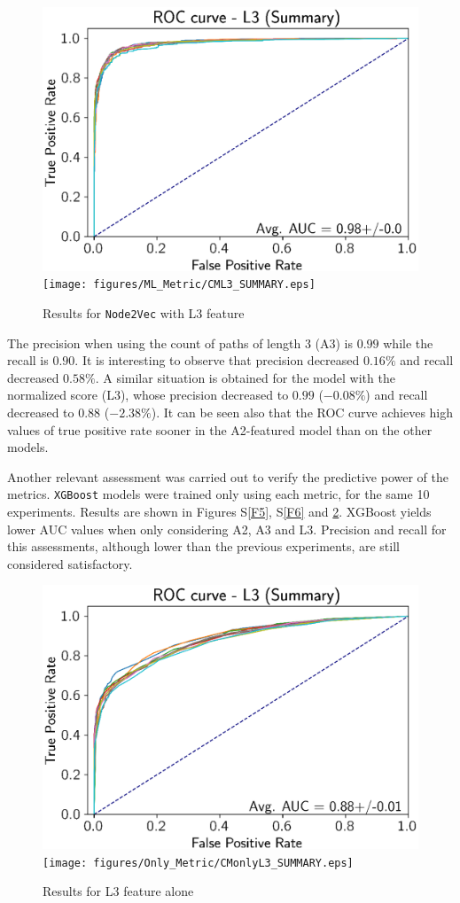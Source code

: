 \begin{figure}[h]
\noindent \begin{centering}
\caption{\label{F4}Results for \texttt{Node2Vec} with L3 feature}
\par\end{centering}
\noindent \raggedleft{}\includegraphics[width=0.48\columnwidth]{figures/ML_Metric/ROCL3_SUMMARY.eps}\texttt{[image: figures/ML\_Metric/CML3\_SUMMARY.eps]}
\end{figure}

The precision when using the count of paths of length 3 (A3) is $0.99$
while the recall is $0.90$. It is interesting to observe that precision
decreased $0.16\%$ and recall decreased $0.58\%$. A similar situation
is obtained for the model with the normalized score (L3), whose precision
decreased to $0.99$ ($-0.08\%$) and recall decreased to $0.88$
($-2.38\%$). It can be seen also that the ROC curve achieves high
values of true positive rate sooner in the A2-featured model than
on the other models.

Another relevant assessment was carried out to verify the predictive
power of the metrics. \texttt{XGBoost} models were trained only using
each metric, for the same 10 experiments. Results are shown in Figures
S\ref{F5}, S\ref{F6} and \ref{F7}. XGBoost yields lower AUC values
when only considering A2, A3 and L3. Precision and recall for this
assessments, although lower than the previous experiments, are still
considered satisfactory.

\begin{figure}[h]
\noindent \begin{centering}
\caption{\label{F7}Results for L3 feature alone}
\par\end{centering}
\noindent \raggedleft{}\includegraphics[width=0.48\columnwidth]{figures/Only_Metric/ROConlyL3_SUMMARY.eps}\texttt{[image: figures/Only\_Metric/CMonlyL3\_SUMMARY.eps]}
\end{figure}

